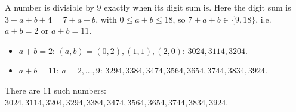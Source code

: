 A number is divisible by $9$ exactly when its digit sum is. Here the digit sum is $3+a+b+4=7+a+b$, with $0\le a+b\le18$, so $7+a+b\in\{9,18\}$, i.e.\ $a+b=2$ or $a+b=11$.
\begin{itemize}
\item $a+b=2$: $(a,b)=(0,2),(1,1),(2,0)$: $3024,3114,3204$.
\item $a+b=11$: $a=2,\dots,9$: $3294,3384,3474,3564,3654,3744,3834,3924$.
\end{itemize}
There are $\boxed{11}$ such numbers: $3024,3114,3204,3294,3384,3474,3564,3654,3744,3834,3924$.
